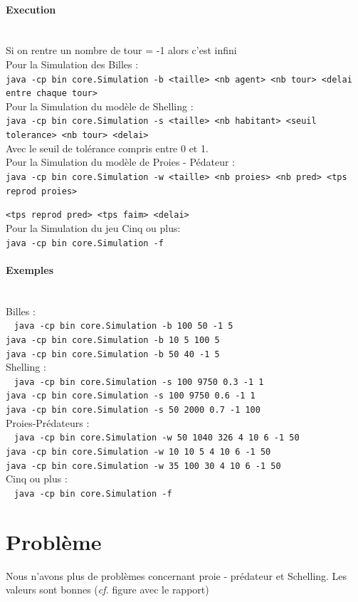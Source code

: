 \documentclass[a4paper,10pt]{article}
\begin{document}
\paragraph{Execution} ~\\
Si on rentre un nombre de tour = -1 alors c'est infini \\

Pour la Simulation des Billes : \\ 
\verb&java -cp bin core.Simulation -b <taille> <nb agent> <nb tour> <delai entre chaque tour>& \\

Pour la Simulation du mod\`ele de Shelling : \\ 
\verb&java -cp bin core.Simulation -s <taille> <nb habitant> <seuil tolerance> <nb tour> <delai>& \\
Avec le seuil de tol\'erance compris entre 0 et 1. \\

Pour la Simulation du mod\`ele de Proies - P\'edateur : \\ 
\verb&java -cp bin core.Simulation -w <taille> <nb proies> <nb pred> <tps reprod proies>&

\verb&<tps reprod pred> <tps faim> <delai>& \\
 
 Pour la Simulation du jeu Cinq ou plus: \\ 
\verb&java -cp bin core.Simulation -f& \\

\paragraph{Exemples} ~\\

Billes : \\
~
\verb&java -cp bin core.Simulation -b 100 50 -1 5& \\
\verb&java -cp bin core.Simulation -b 10 5 100 5& \\
\verb&java -cp bin core.Simulation -b 50 40 -1 5& \\

Shelling : \\
~
\verb&java -cp bin core.Simulation -s 100 9750 0.3 -1 1& \\
\verb&java -cp bin core.Simulation -s 100 9750 0.6 -1 1 & \\
\verb&java -cp bin core.Simulation -s 50 2000 0.7 -1 100 & \\

Proies-Pr\'edateurs : \\
~
\verb&java -cp bin core.Simulation -w 50 1040 326 4 10 6 -1 50& \\
\verb&java -cp bin core.Simulation -w 10 10 5 4 10 6 -1 50& \\
\verb&java -cp bin core.Simulation -w 35 100 30 4 10 6 -1 50& \\

Cinq ou plus : \\
~
\verb&java -cp bin core.Simulation -f&

\section{Probl\`eme}

Nous n'avons plus de probl\`emes concernant proie - pr\'edateur et Schelling. Les valeurs sont bonnes (\emph{cf.} figure avec le rapport)
\end{document}
